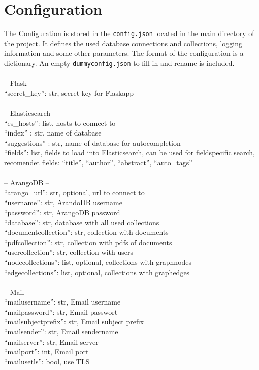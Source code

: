 \section{Configuration}
The Configuration is stored in the \texttt{config.json} located in the main directory of the project. It defines the used database connections and collections, logging information and some other parameters. The format of the configuration is a dictionary. An empty \texttt{dummyconfig.json} to fill in and rename is included.\\
\\
-- Flask --\\
``secret\_key'': str, secret key for Flaskapp\\
 \\
-- Elasticsearch --\\
 ``es\_hosts'': list, hosts to connect to\\
 ``index'' : str, name of database\\
 ``suggestions'' : str, name of database for autocompletion\\
 ``fields'': list, fields to load into Elasticsearch, can be used for fieldspecific search, recomendet fields: ``title'', ``author'', ``abstract'', ``auto\_tags''\\
 \\
-- ArangoDB --\\
 ``arango\_url'': str, optional, url to connect to\\
 ``username'': str, ArandoDB username\\
 ``password'': str, ArangoDB password\\
 ``database'': str, database with all used collections\\
 ``documentcollection'': str, collection with documents\\
 ``pdfcollection'': str, collection with pdfs of documents\\
 ``usercollection'':  str, collection with users\\
 ``nodecollections'': list, optional, collections with graphnodes\\
 ``edgecollections'': list, optional, collections with graphedges\\
 \\
-- Mail --\\
 ``mailusername'': str, Email username\\
 ``mailpassword'': str, Email passwort\\
 ``mailsubjectprefix'': str, Email subject prefix\\
 ``mailsender'': str, Email sendername\\
 ``mailserver'': str, Email server\\
 ``mailport'': int, Email port\\
 ``mailusetls'': bool, use TLS\\
